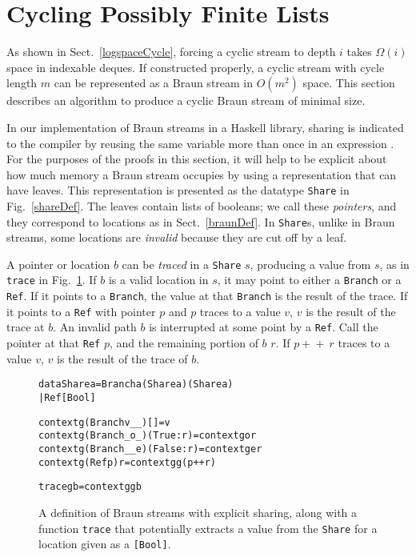 \documentclass[envcountsect]{llncs}
\newcommand{\app}{+\!\!\!+\ }
\newcommand{\share}{{\tt Share} }
\begin{document}
\section{Cycling Possibly Finite Lists}
\label{cycleSect}

As shown in Sect.~\ref{logspaceCycle}, forcing a cyclic stream to depth $i$ takes $\Omega(i)$ space in indexable deques.
If constructed properly, a cyclic stream with cycle length $m$ can be represented as a Braun stream in $O(m^2)$ space.
This section describes an algorithm to produce a cyclic Braun stream of minimal size.

In our implementation of Braun streams in a Haskell library, sharing is indicated to the compiler by reusing the same variable more than once in an expression \cite{website}.
For the purposes of the proofs in this section, it will help to be explicit about how much memory a Braun stream occupies by using a representation that can have leaves.
This representation is presented as the datatype {\tt Share} in Fig.~\ref{shareDef}.
The leaves contain lists of booleans; we call these {\em pointers}, and they correspond to locations as in Sect.~\ref{braunDef}.
In {\tt Share}s, unlike in Braun streams, some locations are {\em invalid} because they are cut off by a leaf.

A pointer or location $b$ can be {\em traced} in a \share $s$, producing a value from $s$, as in {\tt trace} in Fig.~\ref{traceDef}.
If $b$ is a valid location in $s$, it may point to either a {\tt Branch} or a {\tt Ref}.
If it points to a {\tt Branch}, the value at that {\tt Branch} is the result of the trace.
If it points to a {\tt Ref} with pointer $p$ and $p$ traces to a value $v$, $v$ is the result of the trace at $b$.
An invalid path $b$ is interrupted at some point by a {\tt Ref}.
Call the pointer at that {\tt Ref} $p$, and the remaining portion of $b$ $r$.
If $p \app r$ traces to a value $v$, $v$ is the result of the trace of $b$.

\begin{figure}
\begin{alltt}
data Share a = Branch a (Share a) (Share a)
             | Ref [Bool]


context g (Branch v _ _) [] = v
context g (Branch _ o _) (True:r) = context g o r
context g (Branch _ _ e) (False:r) = context g e r
context g (Ref p) r = context g g (p++r)

trace g b = context g g b
\end{alltt}
\caption{A definition of Braun streams with explicit sharing, along with a function {\tt trace} that potentially extracts a value from the {\tt Share} for a location given as a {\tt [Bool]}.}
\label{shareDef}
\label{traceDef}
\end{figure}
\end{document}
